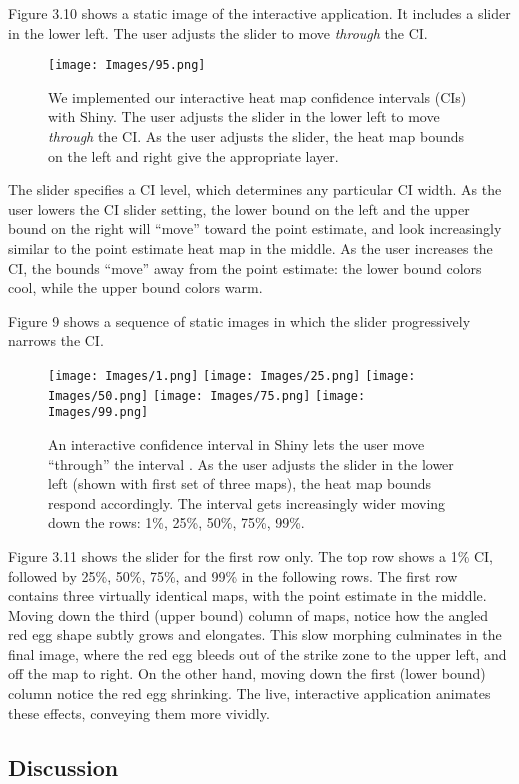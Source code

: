 Figure 3.10 shows a static image of the interactive application. It includes a slider in the lower left. The user adjusts the slider to move {\it through} the CI.
  \begin{figure}[H]
	\centering
	\texttt{[image: Images/95.png]}
	\caption{We implemented our interactive heat map confidence intervals (CIs) with Shiny. The user adjusts the slider in the lower left to move {\it through} the CI. As the user adjusts the slider, the heat map bounds on the left and right give the appropriate layer.}
	\end{figure}
The slider specifies a CI level, which determines any particular CI width. As the user lowers the CI slider setting, the lower bound on the left and the upper bound on the right will ``move'' toward the point estimate, and look increasingly similar to the point estimate heat map in the middle. As the user increases the CI, the bounds ``move'' away from the point estimate: the lower bound colors cool, while the upper bound colors warm.

Figure 9 shows a sequence of static images in which the slider progressively narrows the CI.
  \begin{figure}[H]
	\centering
	\texttt{[image: Images/1.png]}
	\texttt{[image: Images/25.png]}
	\texttt{[image: Images/50.png]}
	\texttt{[image: Images/75.png]}
	\texttt{[image: Images/99.png]}
	\caption{An interactive confidence interval in Shiny lets the user move ``through'' the interval \citep{Shiny}. As the user adjusts the slider in the lower left (shown with first set of three maps), the heat map bounds respond accordingly. The interval gets increasingly wider moving down the rows: 1\%, 25\%, 50\%, 75\%, 99\%.}
	\end{figure}
Figure 3.11 shows the slider for the first row only. The top row shows a 1\% CI, followed by 25\%, 50\%, 75\%, and 99\% in the following rows. The first row contains three virtually identical maps, with the point estimate in the middle. Moving down the third (upper bound) column of maps, notice how the angled red egg shape subtly grows and elongates. This slow morphing culminates in the final image, where the red egg bleeds out of the strike zone to the upper left, and off the map to right. On the other hand, moving down the first (lower bound) column notice the red egg shrinking. The live, interactive application animates these effects, conveying them more vividly.

\subsection{Discussion}


